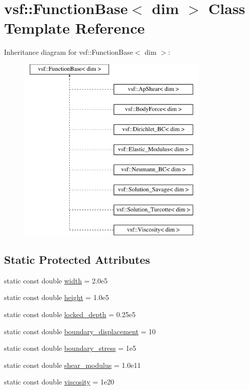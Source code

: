 \hypertarget{classvsf_1_1FunctionBase}{\section{vsf\-:\-:Function\-Base$<$ dim $>$ Class Template Reference}
\label{classvsf_1_1FunctionBase}
}
Inheritance diagram for vsf\-:\-:Function\-Base$<$ dim $>$\-:\begin{figure}[H]
\begin{center}
\leavevmode
\includegraphics[height=9.000000cm]{classvsf_1_1FunctionBase}
\end{center}
\end{figure}
\subsection*{Static Protected Attributes}
\begin{DoxyCompactItemize}
\item 
static const double \hyperlink{classvsf_1_1FunctionBase_ad2bf6791357d301b7d838b6188ef646e}{width} = 2.\-0e5
\item 
static const double \hyperlink{classvsf_1_1FunctionBase_acfffb54eadb79217d150a73e3797b25a}{height} = 1.\-0e5
\item 
static const double \hyperlink{classvsf_1_1FunctionBase_ae06ffa81ca26e9ead535d50596d852c1}{locked\-\_\-depth} = 0.\-25e5
\item 
static const double \hyperlink{classvsf_1_1FunctionBase_a70a9a9f8a1a73386e582c529338f2d5e}{boundary\-\_\-displacement} = 10
\item 
static const double \hyperlink{classvsf_1_1FunctionBase_a342cfaf03d11de71ca34234f48e8825e}{boundary\-\_\-stress} = 1e5
\item 
static const double \hyperlink{classvsf_1_1FunctionBase_a6fc26a27ba1d3a74dfe144a16d7893aa}{shear\-\_\-modulus} = 1.\-0e11
\item 
static const double \hyperlink{classvsf_1_1FunctionBase_af8a2b8711f526a821e1a37a396c9b48f}{viscosity} = 1e20
\end{DoxyCompactItemize}


